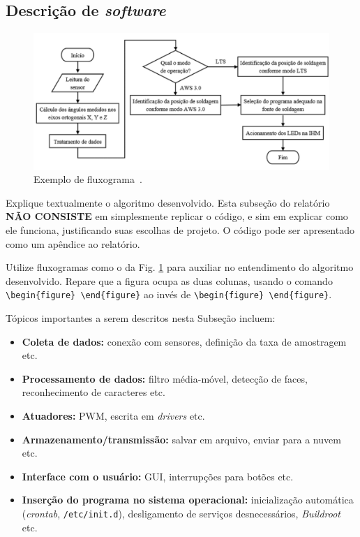 \subsection{Descrição de \textit{software}}\label{subsec:software}

\begin{figure}[!htpb]
\centering
\includegraphics[width=.8\textwidth]{figuras/exemplo_de_fluxograma.png}
\caption{Exemplo de fluxograma~\cite{ref:exemplo_fluxograma}.}
\label{fig:exemplo_fluxograma}
\end{figure}

Explique textualmente o algoritmo desenvolvido.
Esta subseção do relatório \textbf{NÃO CONSISTE} em simplesmente replicar o código, e sim em explicar como ele funciona, justificando suas escolhas de projeto.
O código pode ser apresentado como um apêndice ao relatório. 

Utilize fluxogramas como o da Fig. \ref{fig:exemplo_fluxograma} para auxiliar no entendimento do algoritmo desenvolvido.
Repare que a figura ocupa as duas colunas, usando o comando \verb|\begin{figure} \end{figure}| ao invés de \verb|\begin{figure} \end{figure}|.

Tópicos importantes a serem descritos nesta Subseção incluem:

\begin{itemize}
    \item \textbf{Coleta de dados:} conexão com sensores, definição da taxa de amostragem etc.
    \item \textbf{Processamento de dados:} filtro média-móvel, detecção de faces, reconhecimento de caracteres etc.	
    \item \textbf{Atuadores:} PWM, escrita em \textit{drivers} etc.	
    \item \textbf{Armazenamento/transmissão:} salvar em arquivo, enviar para a nuvem etc.	
    \item \textbf{Interface com o usuário:} GUI, interrupções para botões etc.
    \item \textbf{Inserção do programa no sistema operacional:} inicialização automática (\textit{crontab}, \texttt{/etc/init.d}), desligamento de serviços desnecessários, \textit{Buildroot} etc.
\end{itemize}